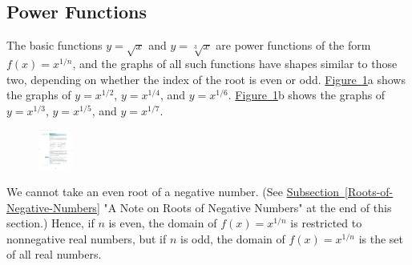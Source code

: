 \documentclass[10pt,]{book}
\theoremstyle{plain}
\theoremstyle{definition}
\theoremstyle{definition}
\theoremstyle{definition}
\theoremstyle{definition}
\theoremstyle{definition}
\numberwithin{equation}{section}
\begin{document}
\subsection[Power Functions]{Power Functions}\label{subsection-72}

    The basic functions \(y = \sqrt{x}\) and \(y = \sqrt[3]{x}\) are power functions of the form \(f (x) = x^{1/n}\), and the graphs of all such functions have shapes similar to those two, depending on whether the index of the root is even or odd. \hyperref[fig-graphs-of-even-and-odd-roots]{Figure~\ref{fig-graphs-of-even-and-odd-roots}}a shows the graphs of \(y = x^{1/2}\), \(y = x^{1/4}\), and \(y = x^{1/6}\). \hyperref[fig-graphs-of-even-and-odd-roots]{Figure~\ref{fig-graphs-of-even-and-odd-roots}}b shows the graphs of \(y = x^{1/3}\), \(y = x^{1/5}\), and \(y = x^{1/7}\).
%
\leavevmode%
\begin{figure}
\centering
\includegraphics[width=0.100\textwidth,]{images/fig-graphs-of-even-and-odd-roots.pdf}\caption{\label{fig-graphs-of-even-and-odd-roots}}
\end{figure}
\par

    We cannot take an even root of a negative number. (See \hyperref[Roots-of-Negative-Numbers]{Subsection~\ref{Roots-of-Negative-Numbers}} "A Note on Roots of Negative Numbers" at the end of this section.) Hence, if \(n\) is even, the domain of \(f (x) = x^{1/n}\) is restricted to nonnegative real numbers, but if \(n\) is odd, the domain of \(f (x) = x^{1/n}\) is the set of all real numbers.
%
\par
\end{document}
